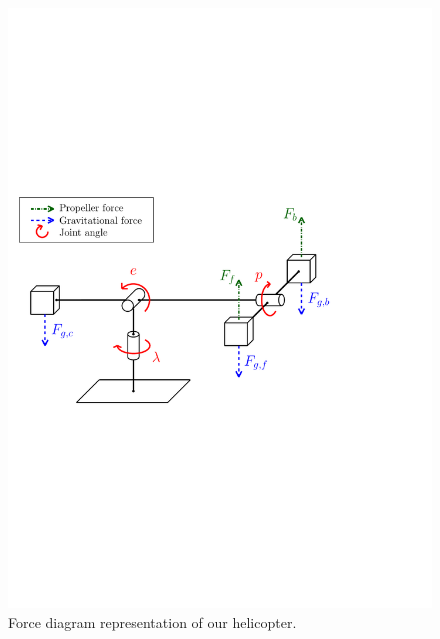 \begin{figure}[tp]
	\centering
	\includegraphics[width=1.00\textwidth]{figures/forces.pdf}
	\caption{Force diagram representation of our helicopter.}
\label{fig:heli}
\end{figure}

